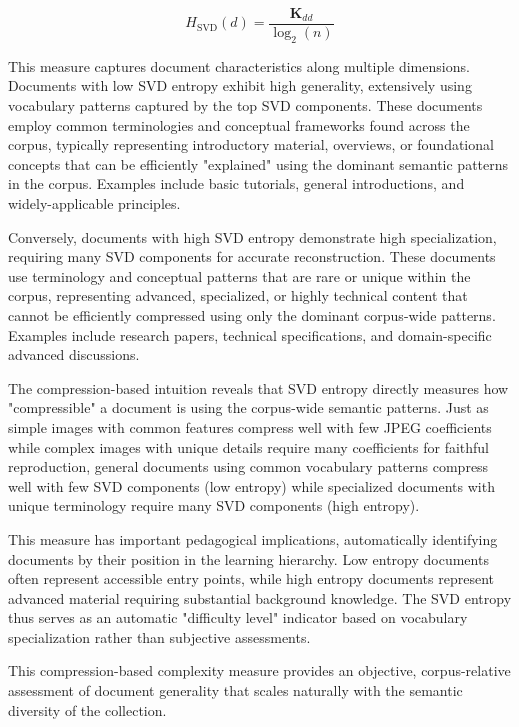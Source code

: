 \documentclass[12pt,a4paper]{article}
\begin{document}
\begin{equation}
H_{\text{SVD}}(d) = \frac{\mathbf{K}_{dd}}{\log_2(n)}
\end{equation}

This measure captures document characteristics along multiple dimensions. Documents with low SVD entropy exhibit high generality, extensively using vocabulary patterns captured by the top SVD components. These documents employ common terminologies and conceptual frameworks found across the corpus, typically representing introductory material, overviews, or foundational concepts that can be efficiently "explained" using the dominant semantic patterns in the corpus. Examples include basic tutorials, general introductions, and widely-applicable principles.

Conversely, documents with high SVD entropy demonstrate high specialization, requiring many SVD components for accurate reconstruction. These documents use terminology and conceptual patterns that are rare or unique within the corpus, representing advanced, specialized, or highly technical content that cannot be efficiently compressed using only the dominant corpus-wide patterns. Examples include research papers, technical specifications, and domain-specific advanced discussions.

The compression-based intuition reveals that SVD entropy directly measures how "compressible" a document is using the corpus-wide semantic patterns. Just as simple images with common features compress well with few JPEG coefficients while complex images with unique details require many coefficients for faithful reproduction, general documents using common vocabulary patterns compress well with few SVD components (low entropy) while specialized documents with unique terminology require many SVD components (high entropy).

This measure has important pedagogical implications, automatically identifying documents by their position in the learning hierarchy. Low entropy documents often represent accessible entry points, while high entropy documents represent advanced material requiring substantial background knowledge. The SVD entropy thus serves as an automatic "difficulty level" indicator based on vocabulary specialization rather than subjective assessments.

This compression-based complexity measure provides an objective, corpus-relative assessment of document generality that scales naturally with the semantic diversity of the collection.
\end{document}
